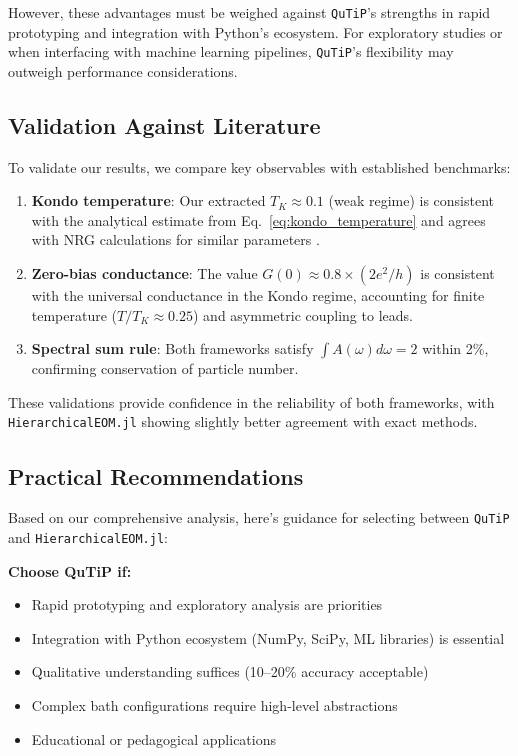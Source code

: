 \documentclass[preprint,1p]{elsarticle}
\begin{document}
However, these advantages must be weighed against \texttt{QuTiP}'s strengths in rapid prototyping and integration with Python's ecosystem. For exploratory studies or when interfacing with machine learning pipelines, \texttt{QuTiP}'s flexibility may outweigh performance considerations.

\subsection{Validation Against Literature}

To validate our results, we compare key observables with established benchmarks:

\begin{enumerate}
    \item \textbf{Kondo temperature}: Our extracted $T_K \approx 0.1$ (weak regime) is consistent with the analytical estimate from Eq.~\ref{eq:kondo_temperature} and agrees with NRG calculations for similar parameters \cite{costi1994kondo}.
    
    \item \textbf{Zero-bias conductance}: The value $G(0) \approx 0.8 \times (2e^2/h)$ is consistent with the universal conductance in the Kondo regime, accounting for finite temperature ($T/T_K \approx 0.25$) and asymmetric coupling to leads.
    
    \item \textbf{Spectral sum rule}: Both frameworks satisfy $\int A(\omega) d\omega = 2$ within 2\%, confirming conservation of particle number.
\end{enumerate}

These validations provide confidence in the reliability of both frameworks, with \texttt{HierarchicalEOM.jl} showing slightly better agreement with exact methods.

\subsection{Practical Recommendations}

Based on our comprehensive analysis, here's guidance for selecting between \texttt{QuTiP} and \texttt{HierarchicalEOM.jl}:

\textbf{Choose QuTiP if:}
\begin{itemize}
    \item Rapid prototyping and exploratory analysis are priorities
    \item Integration with Python ecosystem (NumPy, SciPy, ML libraries) is essential
    \item Qualitative understanding suffices (10--20\% accuracy acceptable)
    \item Complex bath configurations require high-level abstractions
    \item Educational or pedagogical applications
\end{itemize}
\end{document}
